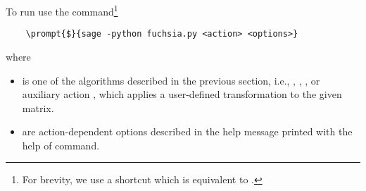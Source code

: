 \documentclass[12pt,a4paper]{article}
\begin{document}
To run \fuchsia use the command\footnote{For brevity, we use a shortcut  which is equivalent to .}
\begin{Verbatim}
    \prompt{$}{sage -python fuchsia.py <action> <options>}
\end{Verbatim}
where
\begin{itemize}
  \item {} is one of the algorithms described in the previous section, i.e., , , , or auxiliary action , which applies a user-defined transformation to the given matrix.
  \item {} are action-dependent options described in the help message printed with the help of  command.
\end{itemize}
\end{document}
